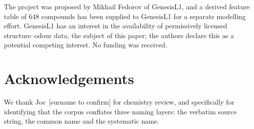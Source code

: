 \documentclass[
  computerscience
]{genesisl1-paper}
\begin{document}
The project was proposed by Mikhail Fedorov of GenesisL1, and a derived feature table of
648 compounds has been supplied to GenesisL1 for a separate modelling effort. GenesisL1
has an interest in the availability of permissively licensed structure--odour data, the
subject of this paper; the authors declare this as a potential competing interest. No
funding was received.

\section*{Acknowledgements}

We thank Joe~[surname to confirm] for chemistry review, and specifically for identifying
that the corpus conflates three naming layers: the verbatim source string, the common
name and the systematic name.


\begingroup
\small
\setlength{\bibsep}{0pt plus 0.3ex}


\endgroup
\end{document}
